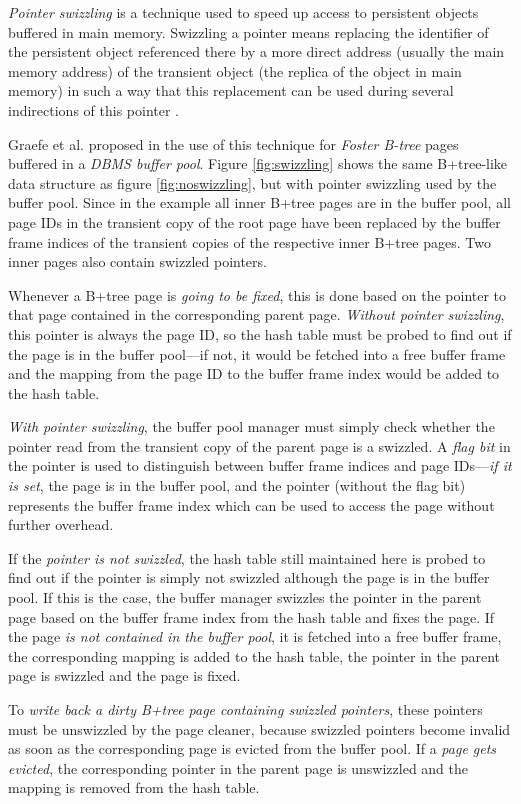 \begin{@empty}
    \emph{Pointer swizzling} is a technique used to speed up access to persistent objects buffered in main memory. Swizzling a pointer means replacing the identifier of the persistent object referenced there by a more direct address (usually the main memory address) of the transient object (the replica of the object in main memory) in such a way that this replacement can be used during several indirections of this pointer \cite{Moss:1992}.

    Graefe et al. proposed in \cite{Graefe:2014} the use of this technique for \emph{Foster B-tree} pages buffered in a \emph{DBMS buffer pool}. Figure \ref{fig:swizzling} shows the same B+tree-like data structure as figure \ref{fig:noswizzling}, but with pointer swizzling used by the buffer pool. Since in the example all inner B+tree pages are in the buffer pool, all page IDs in the transient copy of the root page have been replaced by the buffer frame indices of the transient copies of the respective inner B+tree pages. Two inner pages also contain swizzled pointers.

    Whenever a B+tree page is \emph{going to be fixed}, this is done based on the pointer to that page contained in the corresponding parent page. \emph{Without pointer swizzling}, this pointer is always the page ID, so the hash table must be probed to find out if the page is in the buffer pool---if not, it would be fetched into a free buffer frame and the mapping from the page ID to the buffer frame index would be added to the hash table.

    \emph{With pointer swizzling}, the buffer pool manager must simply check whether the pointer read from the transient copy of the parent page is a swizzled. A \emph{flag bit} in the pointer is used to distinguish between buffer frame indices and page IDs---\emph{if it is set}, the page is in the buffer pool, and the pointer (without the flag bit) represents the buffer frame index which can be used to access the page without further overhead.

    If the \emph{pointer is not swizzled}, the hash table still maintained here is probed to find out if the pointer is simply not swizzled although the page is in the buffer pool. If this is the case, the buffer manager swizzles the pointer in the parent page based on the buffer frame index from the hash table and fixes the page. If the page \emph{is not contained in the buffer pool}, it is fetched into a free buffer frame, the corresponding mapping is added to the hash table, the pointer in the parent page is swizzled and the page is fixed.

    To \emph{write back a dirty B+tree page containing swizzled pointers}, these pointers must be unswizzled by the page cleaner, because swizzled pointers become invalid as soon as the corresponding page is evicted from the buffer pool. If a \emph{page gets evicted}, the corresponding pointer in the parent page is unswizzled and the mapping is removed from the hash table.
\end{@empty}

